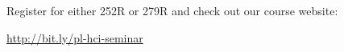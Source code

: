 \documentclass[14pt]{extarticle}
\begin{document}
\vfill

\begin{center}
\large{Register for either 252R or 279R and check out our course website:}


\href{http://bit.ly/pl-hci-seminar}{\Large http://bit.ly/pl-hci-seminar}
\end{center}
\end{document}
